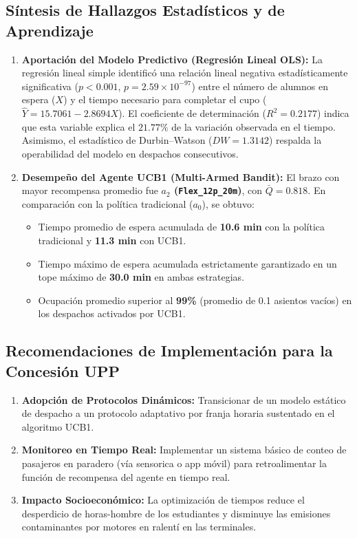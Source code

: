 \newpage
\subsection{Síntesis de Hallazgos Estadísticos y de Aprendizaje}

\begin{enumerate}
	\item \textbf{Aportación del Modelo Predictivo (Regresión Lineal OLS):}
	La regresión lineal simple identificó una relación lineal negativa estadísticamente significativa ($p < 0.001$, $p = 2.59 \times 10^{-97}$) entre el número de alumnos en espera ($X$) y el tiempo necesario para completar el cupo ($\widehat{Y} = 15.7061 - 2.8694X$). El coeficiente de determinación ($R^2 = 0.2177$) indica que esta variable explica el $21.77\%$ de la variación observada en el tiempo. Asimismo, el estadístico de Durbin--Watson ($DW = 1.3142$) respalda la operabilidad del modelo en despachos consecutivos.

	\item \textbf{Desempeño del Agente UCB1 (Multi-Armed Bandit):}
	El brazo con mayor recompensa promedio fue \textbf{$a_2$ (\texttt{Flex\_12p\_20m})}, con $\bar{Q}=0.818$. En comparación con la política tradicional ($a_0$), se obtuvo:
	\begin{itemize}
		\item Tiempo promedio de espera acumulada de \textbf{10.6 min} con la política tradicional y \textbf{11.3 min} con UCB1.
		\item Tiempo máximo de espera acumulada estrictamente garantizado en un tope máximo de \textbf{30.0 min} en ambas estrategias.
		\item Ocupación promedio superior al \textbf{99\%} (promedio de 0.1 asientos vacíos) en los despachos activados por UCB1.
	\end{itemize}
\end{enumerate}

\subsection{Recomendaciones de Implementación para la Concesión UPP}

\begin{tcolorbox}[colback=purpleUPP!5!white,colframe=purpleUPP,title={Recomendaciones de Despliegue Operativo}]
	\begin{enumerate}
		\item \textbf{Adopción de Protocolos Dinámicos:} Transicionar de un modelo estático de despacho a un protocolo adaptativo por franja horaria sustentado en el algoritmo UCB1.
		\item \textbf{Monitoreo en Tiempo Real:} Implementar un sistema básico de conteo de pasajeros en paradero (vía sensorica o app móvil) para retroalimentar la función de recompensa del agente en tiempo real.
		\item \textbf{Impacto Socioeconómico:} La optimización de tiempos reduce el desperdicio de horas-hombre de los estudiantes y disminuye las emisiones contaminantes por motores en ralentí en las terminales.
	\end{enumerate}
\end{tcolorbox}
